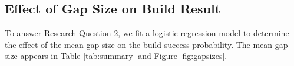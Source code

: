







\subsection{Effect of Gap Size on Build Result}
\label{sec:gapsizeresult}

To answer Research Question 2, we fit a logistic regression model to determine the effect of the mean gap size on the build success probability. The mean gap size appears in Table \ref{tab:summary} and Figure \ref{fig:gapsizes}.

